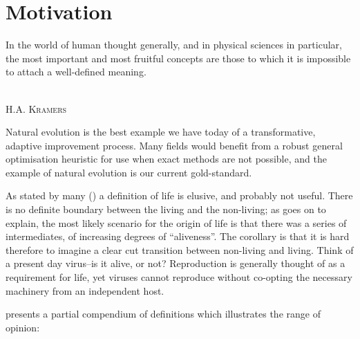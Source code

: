 \section{Motivation}

\epigraph{%
In the world of human thought generally, and in physical sciences in particular, the most important and most fruitful concepts are those to which it is impossible to attach a well-defined meaning.}%
{\textsc{\\H.A. Kramers}}

Natural evolution is the best example we have today of a transformative, adaptive improvement process. Many fields would benefit from a robust general optimisation heuristic for use when exact methods are not possible, and the example of natural evolution is our current gold-standard. 

As stated by many (\eg \parencite{Pascal2013}) a definition of life is elusive, and probably not useful. There is no definite boundary between the living and the non-living; as \parencite{Pascal2013} goes on to explain, the most likely scenario for the origin of life is that there was a series of intermediates, of increasing degrees of ``aliveness''. The corollary is that it is hard therefore to imagine a clear cut transition between non-living and living. Think of a present day virus--is it alive, or not? Reproduction is generally thought of as a requirement for life, yet viruses cannot reproduce without co-opting the necessary machinery from an independent host. 

\parencite{Fernando:2007pf} presents a partial compendium of definitions which illustrates the range of opinion:


